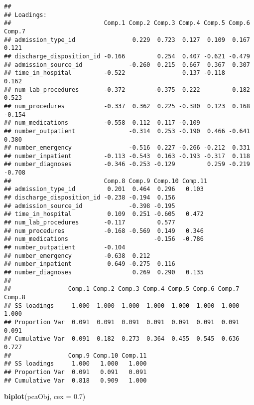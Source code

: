 \documentclass[]{article}
\newenvironment{Shaded}{\begin{snugshade}}{\end{snugshade}}
\newcommand{\KeywordTok}[1]{\textcolor[rgb]{0.13,0.29,0.53}{\textbf{#1}}}
\newcommand{\DataTypeTok}[1]{\textcolor[rgb]{0.13,0.29,0.53}{#1}}
\newcommand{\FloatTok}[1]{\textcolor[rgb]{0.00,0.00,0.81}{#1}}
\newcommand{\NormalTok}[1]{#1}
\begin{document}
\begin{verbatim}
## 
## Loadings:
##                          Comp.1 Comp.2 Comp.3 Comp.4 Comp.5 Comp.6 Comp.7
## admission_type_id                0.229  0.723  0.127  0.109  0.167  0.121
## discharge_disposition_id -0.166         0.254  0.407 -0.621 -0.479       
## admission_source_id             -0.260  0.215  0.667  0.367  0.307       
## time_in_hospital         -0.522                0.137 -0.118         0.162
## num_lab_procedures       -0.372        -0.375  0.222         0.182  0.523
## num_procedures           -0.337  0.362  0.225 -0.380  0.123  0.168 -0.154
## num_medications          -0.558  0.112  0.117 -0.109                     
## number_outpatient               -0.314  0.253 -0.190  0.466 -0.641  0.380
## number_emergency                -0.516  0.227 -0.266 -0.212  0.331       
## number_inpatient         -0.113 -0.543  0.163 -0.193 -0.317  0.118       
## number_diagnoses         -0.346 -0.253 -0.129         0.259 -0.219 -0.708
##                          Comp.8 Comp.9 Comp.10 Comp.11
## admission_type_id         0.201  0.464  0.296   0.103 
## discharge_disposition_id -0.238 -0.194  0.156         
## admission_source_id             -0.398 -0.195         
## time_in_hospital          0.109  0.251 -0.605   0.472 
## num_lab_procedures       -0.117         0.577         
## num_procedures           -0.168 -0.569  0.149   0.346 
## num_medications                        -0.156  -0.786 
## number_outpatient        -0.104                       
## number_emergency         -0.638  0.212                
## number_inpatient          0.649 -0.275  0.116         
## number_diagnoses                 0.269  0.290   0.135 
## 
##                Comp.1 Comp.2 Comp.3 Comp.4 Comp.5 Comp.6 Comp.7 Comp.8
## SS loadings     1.000  1.000  1.000  1.000  1.000  1.000  1.000  1.000
## Proportion Var  0.091  0.091  0.091  0.091  0.091  0.091  0.091  0.091
## Cumulative Var  0.091  0.182  0.273  0.364  0.455  0.545  0.636  0.727
##                Comp.9 Comp.10 Comp.11
## SS loadings     1.000   1.000   1.000
## Proportion Var  0.091   0.091   0.091
## Cumulative Var  0.818   0.909   1.000
\end{verbatim}

\begin{Shaded}
\begin{Highlighting}[]
\KeywordTok{biplot}\NormalTok{(pcaObj, }\DataTypeTok{cex =} \FloatTok{0.7}\NormalTok{)}
\end{Highlighting}
\end{Shaded}
\end{document}
